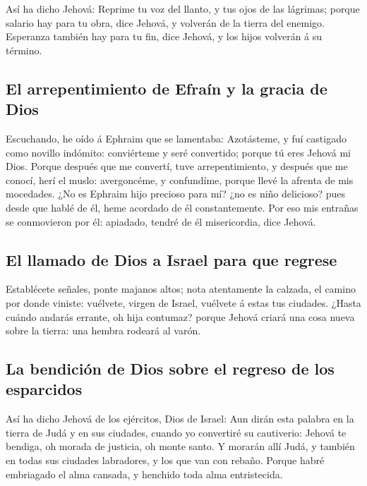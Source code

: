  Así ha dicho Jehová: Reprime tu voz del llanto, y tus ojos
de las lágrimas; porque salario hay para tu obra, dice Jehová, y
volverán de la tierra del enemigo.  Esperanza también hay
para tu fin, dice Jehová, y los hijos volverán á su término.

\hypertarget{el-arrepentimiento-de-efrauxedn-y-la-gracia-de-dios}{%
\subsection{El arrepentimiento de Efraín y la gracia de
Dios}\label{el-arrepentimiento-de-efrauxedn-y-la-gracia-de-dios}}

 Escuchando, he oído á Ephraim que se lamentaba:
Azotásteme, y fuí castigado como novillo indómito: conviérteme y seré
convertido; porque tú eres Jehová mi Dios.  Porque después
que me convertí, tuve arrepentimiento, y después que me conocí, herí el
muslo: avergoncéme, y confundíme, porque llevé la afrenta de mis
mocedades.  ¿No es Ephraim hijo precioso para mí? ¿no es
niño delicioso? pues desde que hablé de él, heme acordado de él
constantemente. Por eso mis entrañas se conmovieron por él: apiadado,
tendré de él misericordia, dice Jehová.

\hypertarget{el-llamado-de-dios-a-israel-para-que-regrese}{%
\subsection{El llamado de Dios a Israel para que
regrese}\label{el-llamado-de-dios-a-israel-para-que-regrese}}

 Establécete señales, ponte majanos altos; nota atentamente
la calzada, el camino por donde viniste: vuélvete, virgen de Israel,
vuélvete á estas tus ciudades.  ¿Hasta cuándo andarás
errante, oh hija contumaz? porque Jehová criará una cosa nueva sobre la
tierra: una hembra rodeará al varón.

\hypertarget{la-bendiciuxf3n-de-dios-sobre-el-regreso-de-los-esparcidos}{%
\subsection{La bendición de Dios sobre el regreso de los
esparcidos}\label{la-bendiciuxf3n-de-dios-sobre-el-regreso-de-los-esparcidos}}

 Así ha dicho Jehová de los ejércitos, Dios de Israel: Aun
dirán esta palabra en la tierra de Judá y en sus ciudades, cuando yo
convertiré su cautiverio: Jehová te bendiga, oh morada de justicia, oh
monte santo.  Y morarán allí Judá, y también en todas sus
ciudades labradores, y los que van con rebaño.  Porque
habré embriagado el alma cansada, y henchido toda alma entristecida.

